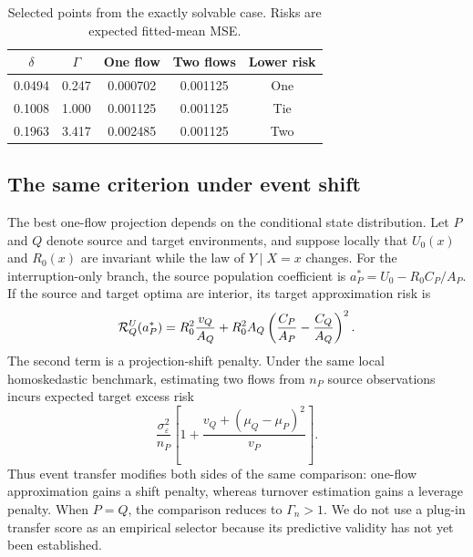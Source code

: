 \begin{table}[t]
\centering
\caption{Selected points from the exactly solvable case. Risks are expected fitted-mean MSE.}
\label{tab:toy}
\small
\begin{tabular}{@{}ccccc@{}}
\toprule
$\delta$ & $\Gamma$ & One flow & Two flows & Lower risk\\
\midrule
0.0494 & 0.247 & 0.000702 & 0.001125 & One\\
0.1008 & 1.000 & 0.001125 & 0.001125 & Tie\\
0.1963 & 3.417 & 0.002485 & 0.001125 & Two\\
\bottomrule
\end{tabular}
\end{table}

\subsection{The same criterion under event shift}

The best one-flow projection depends on the conditional state distribution. Let $P$ and $Q$ denote source and target environments, and suppose locally that $U_0(x)$ and $R_0(x)$ are invariant while the law of $Y\mid X=x$ changes. For the interruption-only branch, the source population coefficient is $a_P^*=U_0-R_0C_P/A_P$. If the source and target optima are interior, its target approximation risk is
\begin{equation}
\mathcal{R}_Q^U(a_P^*)=R_0^2\frac{v_Q}{A_Q}
+R_0^2A_Q\left(\frac{C_P}{A_P}-\frac{C_Q}{A_Q}\right)^2.
\label{eq:projection_shift}
\end{equation}
The second term is a projection-shift penalty. Under the same local homoskedastic benchmark, estimating two flows from $n_P$ source observations incurs expected target excess risk
\begin{equation}
\frac{\sigma_\varepsilon^2}{n_P}
\left[1+\frac{v_Q+(\mu_Q-\mu_P)^2}{v_P}\right].
\label{eq:two_transfer_cost}
\end{equation}
Thus event transfer modifies both sides of the same comparison: one-flow approximation gains a shift penalty, whereas turnover estimation gains a leverage penalty. When $P=Q$, the comparison reduces to $\Gamma_n>1$. We do not use a plug-in transfer score as an empirical selector because its predictive validity has not yet been established.
